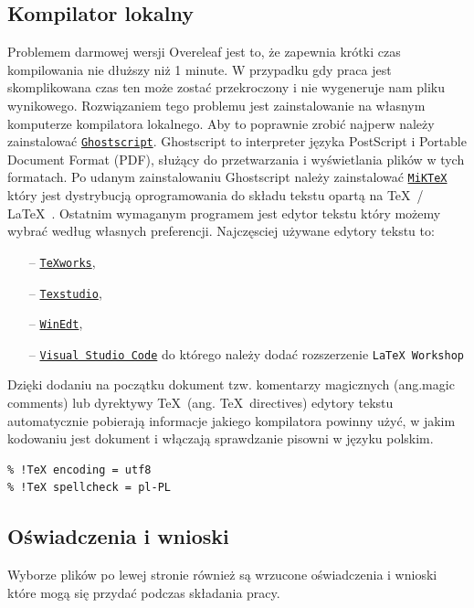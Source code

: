 \subsection{Kompilator lokalny}\label{sec:kompilator_lokalny}
Problemem darmowej wersji Overeleaf jest to, że zapewnia krótki czas kompilowania nie dłuższy niż 1 minute. W przypadku gdy praca jest skomplikowana czas ten może zostać przekroczony i  nie wygeneruje nam pliku wynikowego. Rozwiązaniem tego problemu jest zainstalowanie na własnym komputerze kompilatora lokalnego. Aby to poprawnie zrobić najperw należy zainstalować \href{https://www.ghostscript.com}{\texttt{Ghostscript}}. Ghostscript to interpreter języka PostScript i Portable Document Format (PDF), służący do przetwarzania i wyświetlania plików w tych formatach. Po udanym zainstalowaniu Ghostscript należy zainstalować \href{https://miktex.org/}{\texttt{MiKTeX}} który jest dystrybucją oprogramowania do składu tekstu opartą na \TeX\ / \LaTeX\ . Ostatnim wymaganym programem jest edytor tekstu który możemy wybrać według własnych preferencji. Najczęsciej używane edytory tekstu to:
\begin{itemize}
	\item[--]\href{https://www.tug.org/texworks/}{\texttt{TeXworks}},
	\item[--]\href{https://www.texstudio.org}{\texttt{Texstudio}},
	\item[--]\href{https://www.winedt.com}{\texttt{WinEdt}},
	\item[--]\href{https://code.visualstudio.com}{\texttt{Visual Studio Code}} do którego należy dodać rozszerzenie \texttt{\LaTeX\ Workshop}
\end{itemize}
Dzięki dodaniu na początku dokument tzw. komentarzy magicznych (ang.magic comments) lub dyrektywy \TeX\ (ang. \TeX\ directives) edytory tekstu automatycznie pobierają informacje jakiego kompilatora powinny użyć, w jakim kodowaniu jest dokument i włączają sprawdzanie pisowni w języku polskim.
\begin{lstlisting}[caption={Dyrektywy \TeX\ }, label=lst:Komentarze magiczne]
% !TEX program = xelatex
% !TeX encoding = utf8
% !TeX spellcheck = pl-PL
\end{lstlisting}

\subsection{Oświadczenia i wnioski}
 Wyborze plików po lewej stronie również są wrzucone oświadczenia i wnioski które mogą się przydać podczas składania pracy.
 
